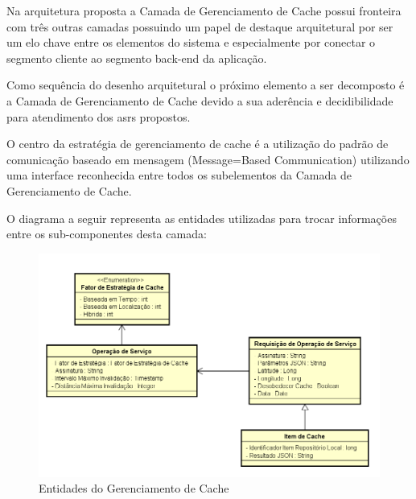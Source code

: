\documentclass[
	article,			%
	11pt,				%
	oneside,			%
	a4paper,			%
	english,			%
	brazil,				%
	sumario=tradicional
]{abntex2}
\begin{document}
Na arquitetura proposta a Camada de Gerenciamento de Cache possui fronteira com três outras camadas possuindo um papel de destaque arquitetural por ser um elo chave entre os elementos do sistema e especialmente por conectar o segmento cliente ao segmento \gls{back-end} da aplicação.

Como sequência do desenho arquitetural o próximo elemento a ser decomposto é a Camada de Gerenciamento de Cache devido a sua aderência e decidibilidade para atendimento dos \glspl{asr} propostos.

O centro da estratégia de gerenciamento de cache é a utilização do padrão de comunicação baseado em mensagem (Message=Based Communication) \cite{meier2009microsoft} utilizando uma interface reconhecida entre todos os subelementos da Camada de Gerenciamento de Cache.

O diagrama a seguir representa as entidades utilizadas para trocar informações entre os sub-componentes desta camada:

\begin{figure}[H]
	\centering
	\includegraphics[scale=0.5]{images/Classes01}
	\caption{Entidades do Gerenciamento de Cache}
\end{figure}
\end{document}
